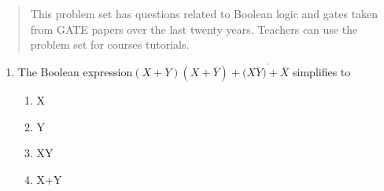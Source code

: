 \documentclass[journal,12pt,twocolumn]{IEEEtran}
\begin{document}

\bigskip

\begin{abstract}
This problem set has questions related to Boolean logic and gates taken from GATE papers over the last twenty years.  Teachers can use the problem set for courses tutorials. 
 
\end{abstract}

\begin{enumerate}
\item The Boolean expression$(X+Y)(X+\overline{Y})+(\overline{X\overline{Y})+\overline{X}}$ simplifies to
      \begin{enumerate}
      \item X
      \item Y
      \item XY
      \item X+Y
      \end{enumerate}
 

\end{enumerate}
\end{document}
